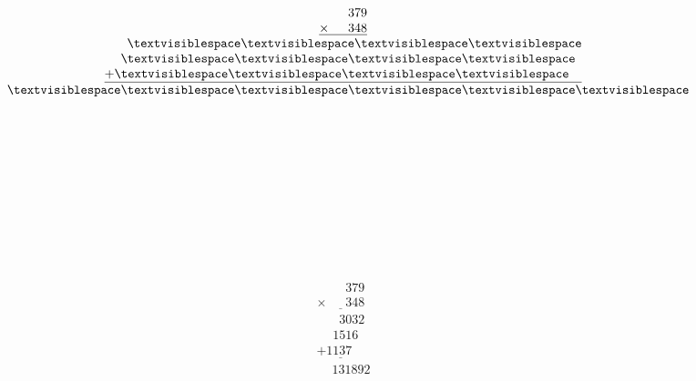 \begin{minipage}[t]{0.3\linewidth}
\begin{align*}\begin{array}{c}
\phantom{
\times000
}
379\\
\underline{
\times
\phantom{
000
}
348
}\\
\phantom{
+00
}
\textvisiblespace
\textvisiblespace
\textvisiblespace
\textvisiblespace
\\
\phantom{
+0
}
\textvisiblespace
\textvisiblespace
\textvisiblespace
\textvisiblespace
\phantom0\\
\underline{
+
\textvisiblespace
\textvisiblespace
\textvisiblespace
\textvisiblespace
\phantom0\phantom0
}
\\
\phantom{+}
\textvisiblespace
\textvisiblespace
\textvisiblespace
\textvisiblespace
\textvisiblespace
\textvisiblespace
\end{array}\end{align*}
\end{minipage}
\begin{minipage}[t]{0.05\linewidth}
\begin{align*}\begin{array}{c}
\textvisiblespace
\\
\textvisiblespace
\\
\textvisiblespace
\\
\textvisiblespace
\\
\textvisiblespace
\\
\textvisiblespace
\end{array}\end{align*}
\end{minipage}
\begin{minipage}[t]{0.05\linewidth}
\begin{align*}\begin{array}{c}
\textvisiblespace
\\
\textvisiblespace
\\
\textvisiblespace
\end{array}\end{align*}
\end{minipage}
\begin{minipage}[t]{0.3\linewidth}
\begin{align*}\begin{array}{c}
\phantom{
\times000
}
379\\
\underline{
\times
\phantom{
000
}
348
}\\
\phantom{
+00
}
3032
\\
\phantom{
+0
}
1516
\phantom0\\
\underline{
+
1137
\phantom0\phantom0
}
\\
\phantom{+}
131892
\end{array}\end{align*}
\end{minipage}
